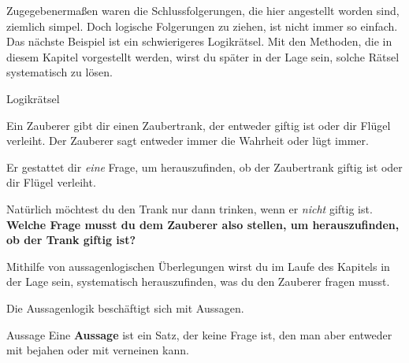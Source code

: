 \documentclass[../../main.tex]{subfiles}
\begin{document}
    Zugegebenermaßen waren die Schlussfolgerungen, die hier angestellt worden 
    sind, ziemlich simpel. Doch logische Folgerungen zu ziehen, ist nicht immer 
    so einfach. Das nächste Beispiel ist ein schwierigeres Logikrätsel. Mit den 
    Methoden, die in diesem Kapitel vorgestellt werden, wirst du später in der 
    Lage sein, solche Rätsel systematisch zu lösen.
    
    \begin{example}{Logikrätsel}
        
        Ein Zauberer gibt dir einen Zaubertrank, der entweder giftig ist oder dir Flügel verleiht. Der Zauberer sagt entweder immer die Wahrheit oder lügt immer.
        
        Er gestattet dir \emph{eine} Frage, um herauszufinden, ob der Zaubertrank giftig ist oder dir Flügel verleiht.
        
        Natürlich möchtest du den Trank nur dann trinken, wenn er \emph{nicht} giftig ist. \textbf{Welche Frage musst du dem Zauberer also stellen, um herauszufinden, ob der Trank giftig ist?}
        
        Mithilfe von aussagenlogischen Überlegungen wirst du im Laufe des Kapitels in der Lage sein, systematisch herauszufinden, was du den Zauberer fragen musst.
    \end{example}
    
    Die Aussagenlogik beschäftigt sich mit Aussagen. 
        
    \begin{definition}{Aussage}
        Eine \textbf{Aussage} ist ein Satz, der keine Frage ist, den man aber entweder mit 
         bejahen oder mit  
        verneinen kann.
    \end{definition}
    
\end{document}
